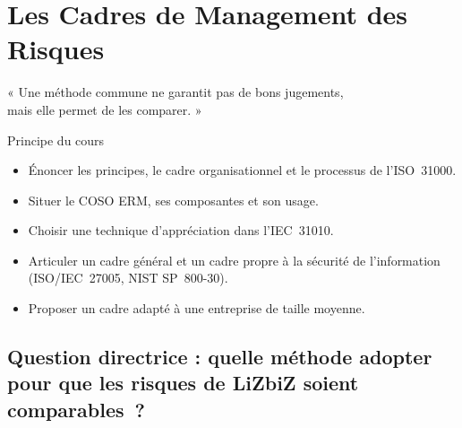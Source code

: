 
\chapter{Les Cadres de Management des Risques}
\label{chap:cadres}

\epigraph{%
    « Une méthode commune ne garantit pas de bons jugements,\\
    mais elle permet de les comparer. »%
}{Principe du cours}


\begin{boxobjectifs}
\begin{itemize}
    \item Énoncer les principes, le cadre organisationnel et le processus de
          l'ISO~31000.
    \item Situer le COSO ERM, ses composantes et son usage.
    \item Choisir une technique d'appréciation dans l'IEC~31010.
    \item Articuler un cadre général et un cadre propre à la sécurité de
          l'information (ISO/IEC~27005, NIST SP~800-30).
    \item Proposer un cadre adapté à une entreprise de taille moyenne.
\end{itemize}
\end{boxobjectifs}

\bigskip

\section*{Question directrice : quelle méthode adopter pour que les risques de LiZbiZ soient comparables~?}

